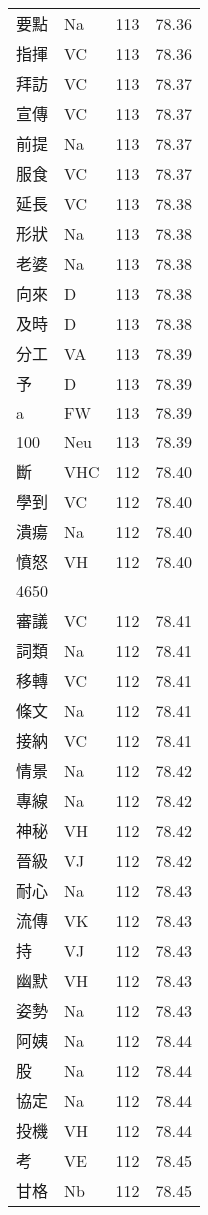\documentclass[twocolumn]{book}
\begin{document}
\begin{supertabular}{llrr}
要點 & Na & 113 &  78.36\\
指揮 & VC & 113 &  78.36\\
拜訪 & VC & 113 &  78.37\\
宣傳 & VC & 113 &  78.37\\
前提 & Na & 113 &  78.37\\
服食 & VC & 113 &  78.37\\
延長 & VC & 113 &  78.38\\
形狀 & Na & 113 &  78.38\\
老婆 & Na & 113 &  78.38\\
向來 & D & 113 &  78.38\\
及時 & D & 113 &  78.38\\
分工 & VA & 113 &  78.39\\
予 & D & 113 &  78.39\\
a & FW & 113 &  78.39\\
100 & Neu & 113 &  78.39\\
斷 & VHC & 112 &  78.40\\
學到 & VC & 112 &  78.40\\
潰瘍 & Na & 112 &  78.40\\
憤怒 & VH & 112 &  78.40\\
4650\\
審議 & VC & 112 &  78.41\\
詞類 & Na & 112 &  78.41\\
移轉 & VC & 112 &  78.41\\
條文 & Na & 112 &  78.41\\
接納 & VC & 112 &  78.41\\
情景 & Na & 112 &  78.42\\
專線 & Na & 112 &  78.42\\
神秘 & VH & 112 &  78.42\\
晉級 & VJ & 112 &  78.42\\
耐心 & Na & 112 &  78.43\\
流傳 & VK & 112 &  78.43\\
持 & VJ & 112 &  78.43\\
幽默 & VH & 112 &  78.43\\
姿勢 & Na & 112 &  78.43\\
阿姨 & Na & 112 &  78.44\\
股 & Na & 112 &  78.44\\
協定 & Na & 112 &  78.44\\
投機 & VH & 112 &  78.44\\
考 & VE & 112 &  78.45\\
甘格 & Nb & 112 &  78.45\\

\end{supertabular}
\end{document}
